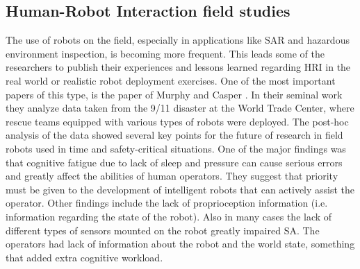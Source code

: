 \documentclass[a4paper,12pt,oneside,openright]{bhamthesis}
\begin{document}
\subsection{Human-Robot Interaction field studies}
\label{section:HRIfield}
The use of robots on the field, especially in applications like SAR and hazardous environment inspection, is becoming more frequent. This leads some of the researchers to publish their experiences and lessons learned regarding HRI in the real world or realistic robot deployment exercises. One of the most important papers of this type, is the paper of Murphy and Casper \citep{CasperMurphy911}. In their seminal work they analyze data taken from the 9/11 disaster at the World Trade Center, where rescue teams equipped with various types of robots were deployed. The post-hoc analysis of the data showed several key points for the future of research in field robots used in time and safety-critical situations. One of the major findings was that cognitive fatigue due to lack of sleep and pressure can cause serious errors and greatly affect the abilities of human operators. They suggest that priority must be given to the development of intelligent robots that can actively assist the operator. Other findings include the lack of proprioception information (i.e. information regarding the state of the robot). Also in many cases the lack of different types of sensors mounted on the robot greatly impaired SA. The operators had lack of information about the robot and the world state, something that added extra cognitive workload. 
\end{document}
